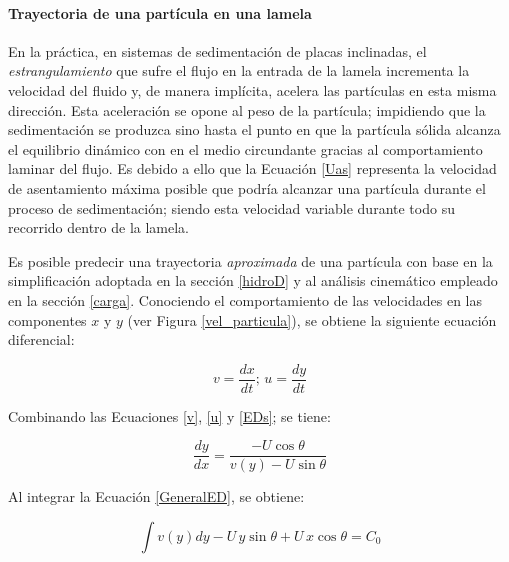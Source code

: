 \paragraph{Trayectoria de una part\'icula en una lamela}

\noindent
\justify

En la pr\'actica, en sistemas de sedimentaci\'on de placas inclinadas, el \textit{estrangulamiento} que sufre el flujo en la entrada de la lamela incrementa la velocidad del fluido y, de manera impl\'icita, acelera las part\'iculas en esta misma direcci\'on. Esta aceleraci\'on se opone al peso de la part\'icula; impidiendo que la sedimentaci\'on se produzca sino hasta el punto en que la part\'icula s\'olida alcanza el equilibrio din\'amico con en el medio circundante gracias al comportamiento laminar del flujo. Es debido a ello que la Ecuaci\'on \ref{Uas} representa la velocidad de asentamiento m\'axima posible que podr\'ia alcanzar una part\'icula durante el proceso de sedimentaci\'on; siendo esta velocidad variable durante todo su recorrido dentro de la lamela.

\noindent
\justify

Es posible predecir una trayectoria \textit{aproximada} de una part\'icula con base en la simplificaci\'on adoptada en la secci\'on \ref{hidroD} y al an\'alisis cinem\'atico empleado en la secci\'on \ref{carga}. Conociendo el comportamiento de las velocidades en las componentes $x$ y $y$ (ver Figura \ref{vel_particula}), se obtiene la siguiente ecuaci\'on diferencial:

\begin{equation}
	v = \frac{dx}{dt}; \, u = \frac{dy}{dt}
	\label{EDs}
\end{equation}

\noindent
\justify

Combinando las Ecuaciones \ref{v}, \ref{u} y \ref{EDs}; se tiene:

\begin{equation}
	\frac{dy}{dx} = \frac{-U \cos \theta}{v(y)-U \sin \theta}
	\label{GeneralED}
\end{equation}

\noindent
\justify

Al integrar la Ecuaci\'on \ref{GeneralED}, se obtiene:

\begin{equation}
	\int v(y) dy - U \, y \sin \theta + U \, x \cos \theta = C_0
	\label{GeneralI}
\end{equation}

\noindent
\justify



